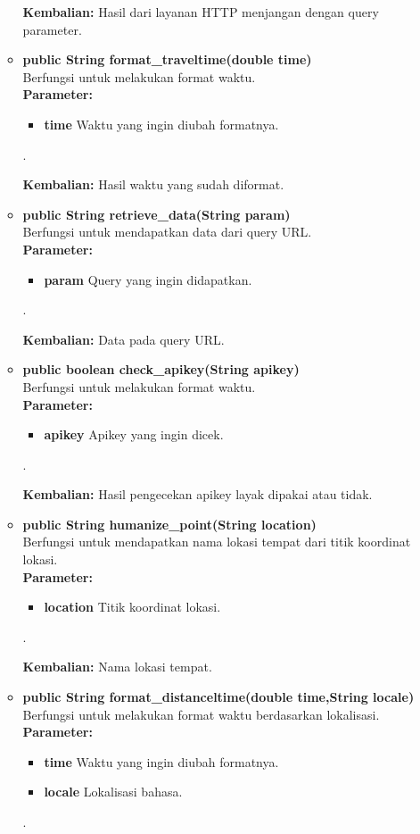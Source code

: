 \begin{enumerate}
\begin{itemize}
		\textbf{Kembalian:}  Hasil dari layanan HTTP menjangan dengan query parameter.
		
		\item \textbf{public String format\_traveltime(double time)}\\
		Berfungsi untuk melakukan format waktu.\\
		\textbf{Parameter:}
				\begin{itemize}
					\item \textbf{time} Waktu yang ingin diubah formatnya.
				\end{itemize}.
				
		\textbf{Kembalian:}  Hasil waktu yang sudah diformat.
		
		\item \textbf{public String retrieve\_data(String param)}\\
		Berfungsi untuk mendapatkan data dari query URL.\\
		\textbf{Parameter:}
				\begin{itemize}
					\item \textbf{param} Query yang ingin didapatkan.
				\end{itemize}.
				
		\textbf{Kembalian:}  Data pada query URL.
		
		\item \textbf{public boolean check\_apikey(String apikey)}\\
		Berfungsi untuk melakukan format waktu.\\
		\textbf{Parameter:}
				\begin{itemize}
					\item \textbf{apikey} Apikey yang ingin dicek.
				\end{itemize}.
				
		\textbf{Kembalian:}  Hasil pengecekan apikey layak dipakai atau tidak.
		
		\item \textbf{public String humanize\_point(String location)}\\
		Berfungsi untuk mendapatkan nama lokasi tempat dari titik koordinat lokasi.\\
		\textbf{Parameter:}
				\begin{itemize}
					\item \textbf{location} Titik koordinat lokasi.
				\end{itemize}.
				
		\textbf{Kembalian:}  Nama lokasi tempat.
		
		\item \textbf{public String format\_distanceltime(double time,String locale)}\\
		Berfungsi untuk melakukan format waktu berdasarkan lokalisasi.\\
		\textbf{Parameter:}
				\begin{itemize}
					\item \textbf{time} Waktu yang ingin diubah formatnya.
					\item \textbf{locale} Lokalisasi bahasa.
				\end{itemize}.
				

\end{itemize}
\end{enumerate}
